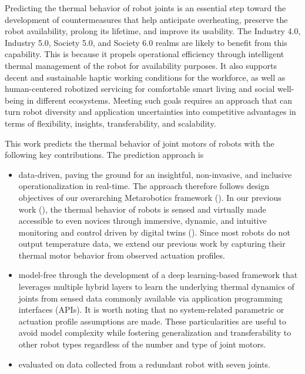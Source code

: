 \documentclass{ifacconf}
\begin{document}
Predicting the thermal behavior of robot joints is an essential step toward the development of countermeasures that help anticipate overheating, preserve the robot availability,  prolong its lifetime, and improve its usability. The Industry 4.0, Industry 5.0,  Society 5.0, and Society 6.0 realms are likely to benefit from this capability. This is because it propels operational efficiency through intelligent thermal management of the robot for availability purposes. It also supports decent and sustainable haptic working conditions for the workforce, as well as human-centered robotized servicing for comfortable smart living and social well-being in different ecosystems. Meeting such goals requires an approach that can turn robot diversity and application uncertainties into competitive advantages in terms of flexibility, insights, transferability, and scalability.

This work predicts  the thermal behavior of joint motors of robots with the following key contributions. The prediction approach is
\begin{itemize}
	\item  data-driven, paving the ground for an  insightful, non-invasive, and inclusive operationalization in real-time. The approach therefore follows  design objectives of our overarching Metarobotics framework (\cite{kaigom2023metarobotics}). In our previous work (\cite{abt}), the thermal behavior of  robots is sensed and virtually made accessible to even novices through  immersive, dynamic, and intuitive monitoring and control driven by digital twins (\cite{kaigom2020value}). Since most robots do not output temperature data, we extend our previous work by capturing their thermal motor behavior from observed  actuation profiles.
	\item model-free through the development of a deep learning-based framework that leverages multiple hybrid layers to learn the underlying thermal dynamics of joints from sensed data commonly available via  application programming interfaces (APIs). It is worth noting that no system-related parametric or actuation profile assumptions are made. These particularities are useful to avoid model complexity while fostering generalization and transferability to other robot types regardless of the number and type of joint motors.
	\item evaluated on data collected from a redundant robot with seven joints.
\end{itemize}
\end{document}
